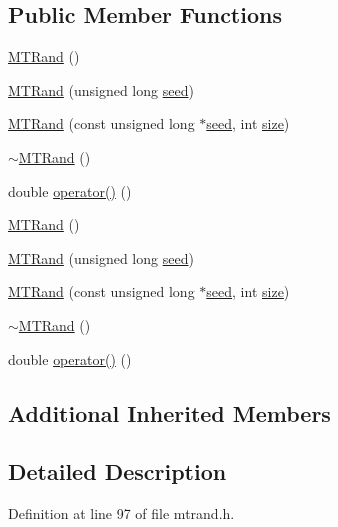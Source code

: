 \subsection*{Public Member Functions}
\begin{DoxyCompactItemize}
\item 
\hyperlink{a00016_a265dc65546e26073c0d5f8787b045a1d}{M\-T\-Rand} ()
\item 
\hyperlink{a00016_a2c88736896bcbdb54bcdd7a0026720d5}{M\-T\-Rand} (unsigned long \hyperlink{a00019_a0c57076fe30358e0700a7ce1baa0ea27}{seed})
\item 
\hyperlink{a00016_a6075a3beacdfb8e4cf48d9fb56cc193a}{M\-T\-Rand} (const unsigned long $\ast$\hyperlink{a00019_a0c57076fe30358e0700a7ce1baa0ea27}{seed}, int \hyperlink{a00104_ae113ea7f9e515a12ac4b5595c6faf61e}{size})
\item 
\hyperlink{a00016_a8c276546a41ae350dc9efc5e9c10a261}{$\sim$\-M\-T\-Rand} ()
\item 
double \hyperlink{a00016_abbb87a08d622d58fdee0eea4cb5471a0}{operator()} ()
\item 
\hyperlink{a00016_a265dc65546e26073c0d5f8787b045a1d}{M\-T\-Rand} ()
\item 
\hyperlink{a00016_a2c88736896bcbdb54bcdd7a0026720d5}{M\-T\-Rand} (unsigned long \hyperlink{a00019_a0c57076fe30358e0700a7ce1baa0ea27}{seed})
\item 
\hyperlink{a00016_a6075a3beacdfb8e4cf48d9fb56cc193a}{M\-T\-Rand} (const unsigned long $\ast$\hyperlink{a00019_a0c57076fe30358e0700a7ce1baa0ea27}{seed}, int \hyperlink{a00104_ae113ea7f9e515a12ac4b5595c6faf61e}{size})
\item 
\hyperlink{a00016_a8c276546a41ae350dc9efc5e9c10a261}{$\sim$\-M\-T\-Rand} ()
\item 
double \hyperlink{a00016_abbb87a08d622d58fdee0eea4cb5471a0}{operator()} ()
\end{DoxyCompactItemize}
\subsection*{Additional Inherited Members}


\subsection{Detailed Description}


Definition at line 97 of file mtrand.\-h.



